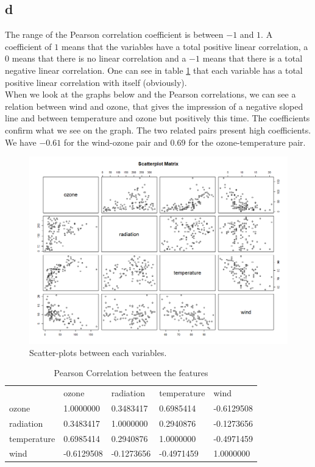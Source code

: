 \documentclass[11pt,a4paper,twoside,openright]{report}
\begin{document}
\subsection*{d}

The range of the Pearson correlation coefficient is between $-1$ and $1$. A coefficient of $1$ means that the variables have a total positive linear correlation, a $0$ means that there is no linear correlation and a $-1$ means that there is a total negative linear correlation. One can see in table \ref{tbl:pearson} that each variable has a total positive linear correlation with itself (obviously). \\

When we look at the graphs below and the Pearson correlations, we can see a relation between wind and ozone, that gives the impression of a negative sloped line and between temperature and ozone  but positively this time. The coefficients confirm what we see on the graph. The two related pairs present high coefficients. We have $-0.61$ for the wind-ozone pair and $0.69$ for the ozone-temperature pair. 
	
\begin{figure}[H]
	\centering
	\includegraphics[width=1\linewidth]{"img/ScatterplotByPair"}
	\caption{Scatter-plots between each variables.}
	\label{fig:scatterplotbypair}
\end{figure}
	


\begin{table}[H]
	\centering
	\label{tbl:pearson}
	\begin{tabular}{lllll}
		& ozone      & radiation  & temperature & wind       \\
		ozone       & 1.0000000  & 0.3483417  & 0.6985414   & -0.6129508 \\
		radiation   & 0.3483417  & 1.0000000  & 0.2940876   & -0.1273656 \\
		temperature & 0.6985414  & 0.2940876  & 1.0000000   & -0.4971459 \\
		wind        & -0.6129508 & -0.1273656 & -0.4971459  & 1.0000000 
	\end{tabular}
	\caption{Pearson Correlation between the features}
\end{table}
	
\end{document}
